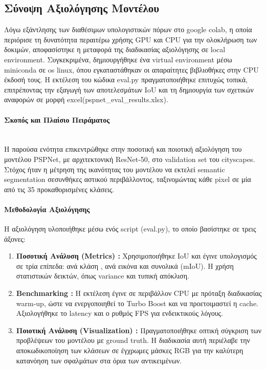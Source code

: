 \documentclass[12pt]{article}
\begin{document}
\subsection{Σύνοψη Αξιολόγησης Μοντέλου}
Λόγω εξάντλησης των διαθέσιμων υπολογιστικών πόρων στο google colab, η οποία περιόρισε τη δυνατότητα περαιτέρω χρήσης GPU και CPU για 
την ολοκλήρωση των δοκιμών, αποφασίστηκε η μεταφορά της διαδικασίας αξιολόγησης σε local environment. Συγκεκριμένα, δημιουργήθηκε ένα 
virtual environment μέσω  miniconda σε os linux, όπου εγκαταστάθηκαν οι απαραίτητες βιβλιοθήκες στην CPU έκδοσή τους. Η εκτέλεση του κώδικα eval.py 
πραγματοποιήθηκε επιτυχώς τοπικά, επιτρέποντας την εξαγωγή των αποτελεσμάτων IoU και τη δημιουργία των σχετικών αναφορών σε μορφή excel(pspnet\_eval\_results.xlsx).
\paragraph{Σκοπός και Πλαίσιο Πειράματος}
\mbox{}\\
Η παρούσα ενότητα επικεντρώθηκε στην ποσοτική και ποιοτική αξιολόγηση του μοντέλου PSPNet, με αρχιτεκτονική ResNet-50, 
στο validation set του cityscapes. Στόχος ήταν η μέτρηση της ικανότητας του μοντέλου να εκτελεί semantic segmentation
σεσυνθήκες αστικού περιβάλλοντος, ταξινομώντας κάθε pixel σε μία από τις 35 προκαθορισμένες κλάσεις.

\paragraph{Μεθοδολογία Αξιολόγησης}
Η αξιολόγηση υλοποιήθηκε μέσω ενός script (eval.py), το οποίο βασίστηκε σε τρεις άξονες:
\begin{enumerate}
    \item  \textbf{Ποσοτική Ανάλυση (Metrics) :} Χρησιμοποιήθηκε IoU και έγινε υπολογισμός σε τρία επίπεδα: ανά κλάση , ανά εικόνα και συνολικά (mIoU).
    Η χρήση στατιστικών δεικτών, όπως variance
    και τυπική απόκλιση.
    \item  \textbf{Benchmarking :}  Η εκτέλεση έγινε σε περιβάλλον CPU με πρόταξη διαδικασίας warm-up, ώστε να ενεργοποιηθεί το Turbo Boost και να προετοιμαστεί η cache. Αξιολογήθηκε το latency και ο ρυθμός FPS για ενδεικτικούς λόγους.                        
    \item  \textbf{Ποιοτική Ανάλυση (Visualization) :} Πραγματοποιήθηκε οπτική σύγκριση των προβλέψεων του μοντέλου με ground truth.
     Η διαδικασία αυτή περιέλαβε 
    την αποκωδικοποίηση των κλάσεων σε έγχρωμες μάσκες RGB για την καλύτερη κατανόηση των σφαλμάτων στα όρια των αντικειμένων.
\end{enumerate}
\end{document}
